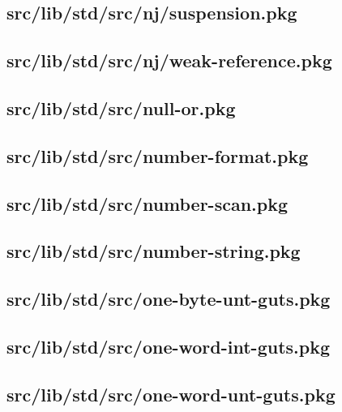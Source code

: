 \subsection{src/lib/std/src/nj/suspension.pkg}


\subsection{src/lib/std/src/nj/weak-reference.pkg}


\subsection{src/lib/std/src/null-or.pkg}


\subsection{src/lib/std/src/number-format.pkg}


\subsection{src/lib/std/src/number-scan.pkg}


\subsection{src/lib/std/src/number-string.pkg}


\subsection{src/lib/std/src/one-byte-unt-guts.pkg}


\subsection{src/lib/std/src/one-word-int-guts.pkg}


\subsection{src/lib/std/src/one-word-unt-guts.pkg}


